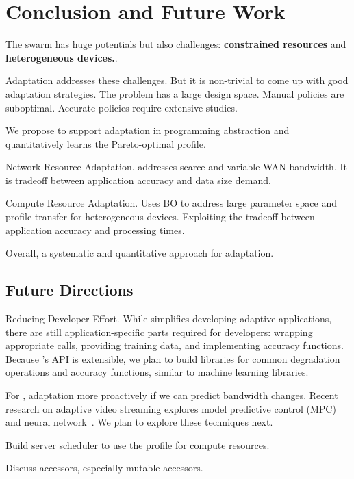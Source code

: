 \documentclass[thesis.tex]{subfiles}
\begin{document}
\chapter{Conclusion and Future Work}
\label{cha:concl-future-work}


The swarm has huge potentials but also challenges: \textbf{constrained
  resources} and \textbf{heterogeneous devices.}.

Adaptation addresses these challenges. But it is non-trivial to come up with
good adaptation strategies. The problem has a large design space. Manual
policies are suboptimal. Accurate policies require extensive studies.

We propose to support adaptation in programming abstraction and quantitatively
learns the Pareto-optimal profile.

Network Resource Adaptation. \awstream{} addresses scarce and variable WAN
bandwidth. It is tradeoff between application accuracy and data size demand.

Compute Resource Adaptation. Uses BO to address large parameter space and
profile transfer for heterogeneous devices. Exploiting the tradeoff between
application accuracy and processing times.

Overall, a systematic and quantitative approach for adaptation.

\section{Future Directions}
\label{sec:future-directions}

Reducing Developer Effort. While \awstream{} simplifies developing adaptive
applications, there are still application-specific parts required for
developers: wrapping appropriate \maybe{} calls, providing training data, and
implementing accuracy functions. Because \awstream{}'s API is extensible, we
plan to build libraries for common degradation operations and accuracy
functions, similar to machine learning libraries.

For \awstream{}, adaptation more proactively if we can predict bandwidth
changes. Recent research on adaptive video streaming explores model predictive
control (MPC)~\cite{yin2015control, sun2016cs2p} and neural
network~\cite{mao2017neural}. We plan to explore these techniques next.

Build server scheduler to use the profile for compute resources.

Discuss accessors, especially mutable accessors.
\end{document}
